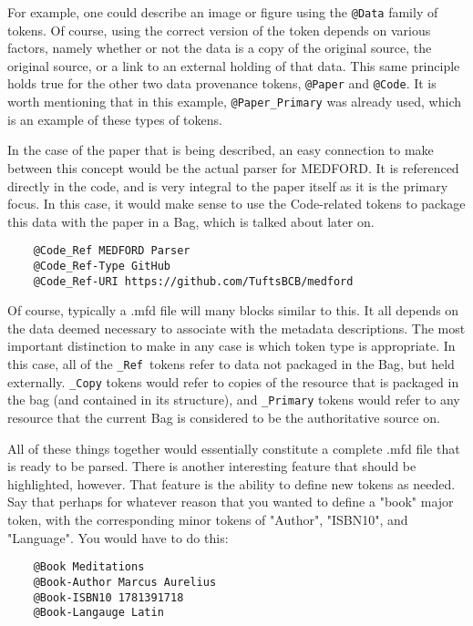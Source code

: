 \documentclass[]{article}%
\begin{document}
For example, one could describe an image or figure using the \texttt{@Data} family of tokens. Of course, using the correct version of the token depends on various factors, namely whether or not the data is a copy of the original source, the original source, or a link to an external holding of that data. This same principle holds true for the other two data provenance tokens, \texttt{@Paper} and \texttt{@Code}. It is worth mentioning that in this example, \texttt{@Paper\_Primary} was already used, which is an example of these types of tokens.

In the case of the paper that is being described, an easy connection to make between this concept would be the actual parser for MEDFORD. It is referenced directly in the code, and is very integral to the paper itself as it is the primary focus. In this case, it would make sense to use the Code-related tokens to package this data with the paper in a Bag, which is talked about later on.

\begin{small}
\begin{verbatim}
    @Code_Ref MEDFORD Parser
    @Code_Ref-Type GitHub
    @Code_Ref-URI https://github.com/TuftsBCB/medford
\end{verbatim}
\end{small}

Of course, typically a .mfd file will many blocks similar to this. It all depends on the data deemed necessary to associate with the metadata descriptions. The most important distinction to make in any case is which token type is appropriate. In this case, all of the \texttt{\_Ref }tokens refer to data not packaged in the Bag, but held externally. \texttt{\_Copy} tokens would refer to copies of the resource that is packaged in the bag (and contained in its structure), and \texttt{\_Primary} tokens would refer to any resource that the current Bag is considered to be the authoritative source on.

All of these things together would essentially constitute a complete .mfd file that is ready to be parsed. There is another interesting feature that should be highlighted, however. That feature is the ability to define new tokens as needed. Say that perhaps for whatever reason that you wanted to define a "book" major token, with the corresponding minor tokens of "Author", "ISBN10", and "Language". You would have to do this:
\begin{verbatim}
    @Book Meditations
    @Book-Author Marcus Aurelius
    @Book-ISBN10 1781391718
    @Book-Langauge Latin
\end{verbatim}
\end{document}
